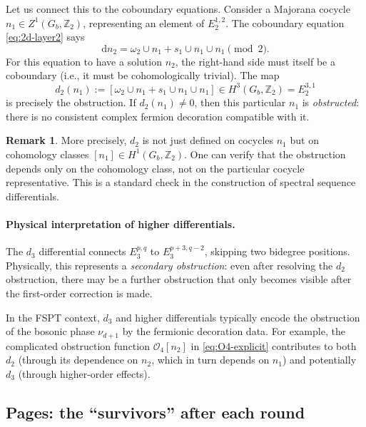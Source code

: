 \documentclass{SciPost}
\theoremstyle{definition}
\newtheorem{remark}[theorem]{Remark}
\newcommand{\Zt}{\mathbb{Z}_2}
\newcommand{\Gb}{G_b}
\newcommand{\dd}{\mathrm{d}}
\begin{document}
Let us connect this to the coboundary equations.
Consider a Majorana cocycle $n_1 \in Z^1(\Gb, \Zt)$, representing an element of $E_2^{1,2}$.
The coboundary equation \eqref{eq:2d-layer2} says
\begin{equation}
\dd n_2 = \omega_2 \cup n_1 + s_1 \cup n_1 \cup n_1 \pmod{2}.
\end{equation}
For this equation to have a solution $n_2$, the right-hand side must itself be a coboundary (i.e., it must be cohomologically trivial).
The map
\begin{equation}
d_2(n_1) := [\omega_2 \cup n_1 + s_1 \cup n_1 \cup n_1] \in H^3(\Gb, \Zt) = E_2^{3,1}
\end{equation}
is precisely the obstruction.
If $d_2(n_1) \neq 0$, then this particular $n_1$ is \emph{obstructed}: there is no consistent complex fermion decoration compatible with it.

\begin{remark}
More precisely, $d_2$ is not just defined on cocycles $n_1$ but on cohomology classes $[n_1] \in H^1(\Gb, \Zt)$.
One can verify that the obstruction depends only on the cohomology class, not on the particular cocycle representative.
This is a standard check in the construction of spectral sequence differentials.
\end{remark}

\paragraph{Physical interpretation of higher differentials.}
The $d_3$ differential connects $E_3^{p,q}$ to $E_3^{p+3, q-2}$, skipping two bidegree positions.
Physically, this represents a \emph{secondary obstruction}: even after resolving the $d_2$ obstruction, there may be a further obstruction that only becomes visible after the first-order correction is made.

In the FSPT context, $d_3$ and higher differentials typically encode the obstruction of the bosonic phase $\nu_{d+1}$ by the fermionic decoration data.
For example, the complicated obstruction function $\mathcal{O}_4[n_2]$ in \eqref{eq:O4-explicit} contributes to both $d_2$ (through its dependence on $n_2$, which in turn depends on $n_1$) and potentially $d_3$ (through higher-order effects).

\subsection{Pages: the ``survivors'' after each round}
\label{subsec:pages}
\end{document}
